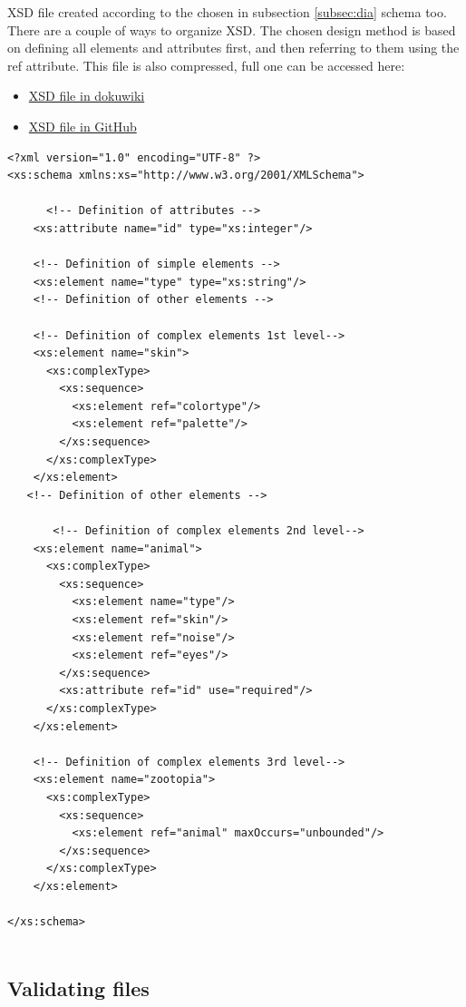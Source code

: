 \documentclass{article}
\begin{document}
XSD file created according to the chosen in subsection \ref{subsec:dia} schema too. There are a couple of ways to organize XSD. The chosen design method is based on defining all elements and attributes first, and then referring to them using the ref attribute.
This file is also compressed, full one can be accessed here:
\begin{itemize}
    \item \href{http://188.130.155.38:11180/doku.php?id=xml_xsd_dtd#xsd_file}{XSD file in dokuwiki}
    \item \href{https://github.com/tyvision/innolabs_es/blob/master/lab1/zootopia.xsd}{XSD file in GitHub}
\end{itemize}

\begin{verbatim}
<?xml version="1.0" encoding="UTF-8" ?>
<xs:schema xmlns:xs="http://www.w3.org/2001/XMLSchema">
 
      <!-- Definition of attributes -->
    <xs:attribute name="id" type="xs:integer"/>
     
    <!-- Definition of simple elements -->
    <xs:element name="type" type="xs:string"/>
    <!-- Definition of other elements --> 
    
    <!-- Definition of complex elements 1st level-->
    <xs:element name="skin">
      <xs:complexType>
        <xs:sequence>
          <xs:element ref="colortype"/>
          <xs:element ref="palette"/>
        </xs:sequence>
      </xs:complexType>
    </xs:element>
   <!-- Definition of other elements -->
   
       <!-- Definition of complex elements 2nd level-->
    <xs:element name="animal">
      <xs:complexType>
        <xs:sequence>
          <xs:element name="type"/>
          <xs:element ref="skin"/>
          <xs:element ref="noise"/>
          <xs:element ref="eyes"/>
        </xs:sequence>
        <xs:attribute ref="id" use="required"/>
      </xs:complexType>
    </xs:element>
     
    <!-- Definition of complex elements 3rd level-->
    <xs:element name="zootopia">
      <xs:complexType>
        <xs:sequence>
          <xs:element ref="animal" maxOccurs="unbounded"/>
        </xs:sequence>
      </xs:complexType>
    </xs:element>
     
</xs:schema>
  
\end{verbatim}

\subsection{Validating files}
\end{document}
